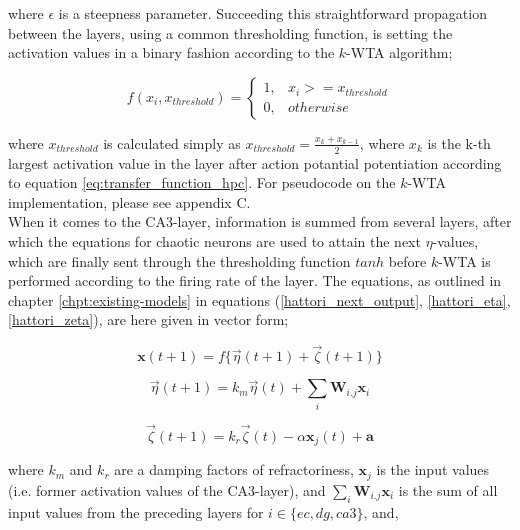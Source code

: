 where $\epsilon$ is a steepness parameter. Succeeding this straightforward propagation between the layers, using a common thresholding function, is setting the activation values in a binary fashion according to the $k$-WTA algorithm;

\begin{equation}
    f(x_i, x_{threshold}) = \begin{cases}
    1, & x_i >= x_{threshold} \\
    0, & otherwise
    \end{cases}
\end{equation}

where $x_{threshold}$ is calculated simply as $x_{threshold} = \frac{x_{k} + x_{k-1}}{2}$, where $x_k$ is the k-th largest activation value in the layer after action potantial potentiation according to equation \ref{eq:transfer_function_hpc}. For pseudocode on the $k$-WTA implementation, please see appendix C.
\\

When it comes to the CA3-layer, information is summed from several layers, after which the equations for chaotic neurons are used to attain the next $\eta$-values, which are finally sent through the thresholding function $tanh$ before $k$-WTA is performed according to the firing rate of the layer. The equations, as outlined in chapter \ref{chpt:existing-models} in equations (\ref{hattori_next_output}, \ref{hattori_eta}, \ref{hattori_zeta}), are here given in vector form;

\begin{equation}\label{eq:eta_zeta_sum}
    \textbf{x}(t+1) = f\{ \vec{\eta}(t+1) + \vec{\zeta}(t+1) \}
\end{equation}

\begin{equation}
    \vec{\eta}(t+1) = k_m \vec{\eta}(t) + \sum_{i} \textbf{W}_{i.j} \textbf{x}_i
\end{equation}

\begin{equation}
    \vec{\zeta}(t+1) = k_r \vec{\zeta}(t) - \alpha \textbf{x}_j(t) + \textbf{a}
\end{equation}

where $k_m$ and $k_r$ are a damping factors of refractoriness, $\textbf{x}_j$ is the input values (i.e. former activation values of the CA3-layer), and $\sum_{i} \textbf{W}_{i.j} \textbf{x}_i$ is the sum of all input values from the preceding layers for $i\in\{ec, dg, ca3\}$, and,

